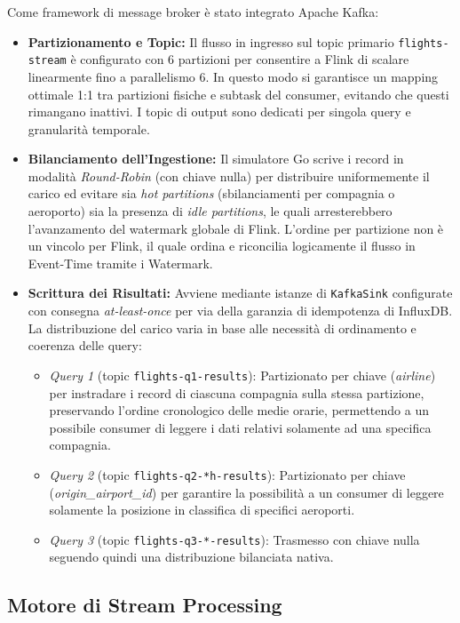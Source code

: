 \documentclass[conference]{IEEEtran}
\begin{document}
Come framework di message broker è stato integrato Apache Kafka:
\begin{itemize}
    \item \textbf{Partizionamento e Topic:} Il flusso in ingresso sul topic primario \texttt{flights-stream} è configurato con 6 partizioni per consentire a Flink di scalare linearmente fino a parallelismo 6. In questo modo si garantisce un mapping ottimale 1:1 tra partizioni fisiche e subtask del consumer, evitando che questi rimangano inattivi. I topic di output sono dedicati per singola query e granularità temporale.
    \item \textbf{Bilanciamento dell'Ingestione:} Il simulatore Go scrive i record in modalità \textit{Round-Robin} (con chiave nulla) per distribuire uniformemente il carico ed evitare sia \textit{hot partitions} (sbilanciamenti per compagnia o aeroporto) sia la presenza di \textit{idle partitions}, le quali arresterebbero l'avanzamento del watermark globale di Flink. L'ordine per partizione non è un vincolo per Flink, il quale ordina e riconcilia logicamente il flusso in Event-Time tramite i Watermark.
    \item \textbf{Scrittura dei Risultati:} Avviene mediante istanze di \texttt{KafkaSink} configurate con consegna \textit{at-least-once} per via della garanzia di idempotenza di InfluxDB. La distribuzione del carico varia in base alle necessità di ordinamento e coerenza delle query:
    \begin{itemize}
        \item \textit{Query 1} (topic \texttt{flights-q1-results}): Partizionato per chiave (\textit{airline}) per instradare i record di ciascuna compagnia sulla stessa partizione, preservando l'ordine cronologico delle medie orarie, permettendo a un possibile consumer di leggere i dati relativi solamente ad una specifica compagnia.
        \item \textit{Query 2} (topic \texttt{flights-q2-*h-results}): Partizionato per chiave (\textit{origin\_airport\_id}) per garantire la possibilità a un consumer di leggere solamente la posizione in classifica di specifici aeroporti.
        \item \textit{Query 3} (topic \texttt{flights-q3-*-results}): Trasmesso con chiave nulla seguendo quindi una distribuzione bilanciata nativa.
    \end{itemize}
\end{itemize}


\subsection{Motore di Stream Processing}\label{subsec:flink_component}
\end{document}
